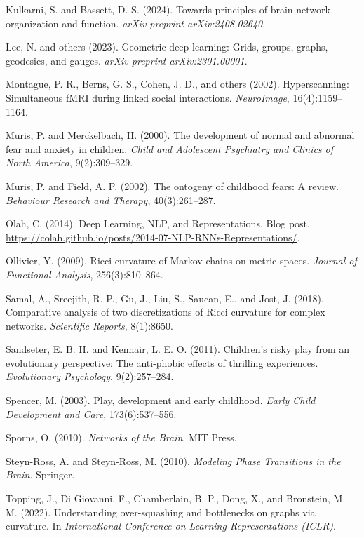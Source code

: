 \documentclass{article}
\theoremstyle{definition}
\begin{document}
\begin{thebibliography}{99}
Kulkarni, S. and Bassett, D. S. (2024).
Towards principles of brain network organization and function.
\textit{arXiv preprint arXiv:2408.02640}.

Lee, N. and others (2023).
Geometric deep learning: Grids, groups, graphs, geodesics, and gauges.
\textit{arXiv preprint arXiv:2301.00001}.

Montague, P. R., Berns, G. S., Cohen, J. D., and others (2002).
Hyperscanning: Simultaneous fMRI during linked social interactions.
\textit{NeuroImage}, 16(4):1159–1164.

Muris, P. and Merckelbach, H. (2000).
The development of normal and abnormal fear and anxiety in children.
\textit{Child and Adolescent Psychiatry and Clinics of North America}, 9(2):309--329.

Muris, P. and Field, A. P. (2002).
The ontogeny of childhood fears: A review.
\textit{Behaviour Research and Therapy}, 40(3):261--287.

Olah, C. (2014).
Deep Learning, NLP, and Representations.
Blog post, \url{https://colah.github.io/posts/2014-07-NLP-RNNs-Representations/}.

Ollivier, Y. (2009).
Ricci curvature of Markov chains on metric spaces.
\textit{Journal of Functional Analysis}, 256(3):810–864.

Samal, A., Sreejith, R. P., Gu, J., Liu, S., Saucan, E., and Jost, J. (2018).
Comparative analysis of two discretizations of Ricci curvature for complex networks.
\textit{Scientific Reports}, 8(1):8650.

Sandseter, E. B. H. and Kennair, L. E. O. (2011).
Children’s risky play from an evolutionary perspective: The anti-phobic effects of thrilling experiences.
\textit{Evolutionary Psychology}, 9(2):257--284.

Spencer, M. (2003).
Play, development and early childhood.
\textit{Early Child Development and Care}, 173(6):537--556.

Sporns, O. (2010).
\textit{Networks of the Brain}.
MIT Press.

Steyn-Ross, A. and Steyn-Ross, M. (2010).
\textit{Modeling Phase Transitions in the Brain}.
Springer.

Topping, J., Di Giovanni, F., Chamberlain, B. P., Dong, X., and Bronstein, M. M. (2022).
Understanding over-squashing and bottlenecks on graphs via curvature.
In \textit{International Conference on Learning Representations (ICLR)}.


\end{thebibliography}
\end{document}
